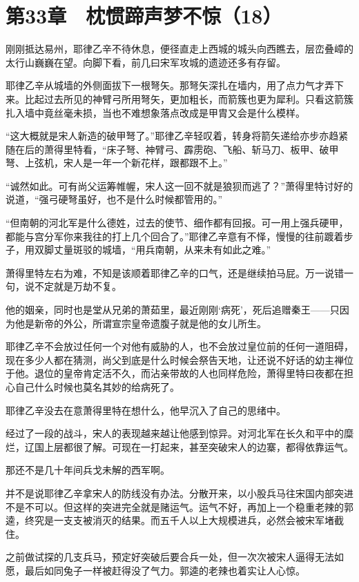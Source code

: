 \section{第33章　枕惯蹄声梦不惊（18）}

刚刚抵达易州，耶律乙辛不待休息，便径直走上西城的城头向西瞧去，层峦叠嶂的太行山巍巍在望。向脚下看，前几曰宋军攻城的遗迹还多有存留。

耶律乙辛从城墙的外侧面拔下一根弩矢。那弩矢深扎在墙内，用了点力气才弄下来。比起过去所见的神臂弓所用弩矢，更加粗长，而箭簇也更为犀利。只看这箭簇扎入墙中竟丝毫未损，当也不难想象落点改成是甲胄又会是什么模样。

“这大概就是宋人新造的破甲弩了。”耶律乙辛轻叹着，转身将箭矢递给亦步亦趋紧随在后的萧得里特看，“床子弩、神臂弓、霹雳砲、飞船、斩马刀、板甲、破甲弩、上弦机，宋人是一年一个新花样，跟都跟不上。”

“诚然如此。可有尚父运筹帷幄，宋人这一回不就是狼狈而逃了？”萧得里特讨好的说道，“强弓硬弩虽好，也不是什么时候都管用的。”

“但南朝的河北军是什么德姓，过去的使节、细作都有回报。可一用上强兵硬甲，都能与宫分军你来我往的打上几个回合了。”耶律乙辛意有不怿，慢慢的往前踱着步子，用双脚丈量斑驳的城墙，“用兵南朝，从来未有如此之难。”

萧得里特左右为难，不知是该顺着耶律乙辛的口气，还是继续拍马屁。万一说错一句，说不定就是万劫不复。

他的姻亲，同时也是堂从兄弟的萧茹里，最近刚刚‘病死’，死后追赠秦王——只因为他是新帝的外公，所谓宣宗皇帝遗腹子就是他的女儿所生。

耶律乙辛不会放过任何一个对他有威胁的人，也不会放过皇位前的任何一道阻碍，现在多少人都在猜测，尚父到底是什么时候会祭告天地，让还说不好话的幼主禅位于他。退位的皇帝肯定活不久，而沾亲带故的人也同样危险，萧得里特曰夜都在担心自己什么时候也莫名其妙的给病死了。

耶律乙辛没去在意萧得里特在想什么，他早沉入了自己的思绪中。

经过了一段的战斗，宋人的表现越来越让他感到惊异。对河北军在长久和平中的糜烂，辽国上层都很了解。可现在一打起来，甚至突破宋人的边寨，都得依靠运气。

那还不是几十年间兵戈未解的西军啊。

并不是说耶律乙辛拿宋人的防线没有办法。分散开来，以小股兵马往宋国内部突进不是不可以。但这样的突进完全就是赌运气。运气不好，再加上一个稳重老辣的郭逵，终究是一支支被消灭的结果。而五千人以上大规模进兵，必然会被宋军堵截住。

之前做试探的几支兵马，预定好突破后要合兵一处，但一次次被宋人逼得无法如愿，最后如同兔子一样被赶得没了气力。郭逵的老辣也着实让人心惊。

